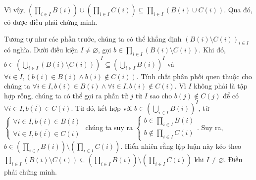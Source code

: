Vì vậy, $\left(\prod_{i \in I}B(i)\right) \cup \left(\prod_{i \in I}C(i)\right) \subseteq \prod_{i \in I}\left(B(i) \cup C(i)\right)$. Qua đó, có được điều phải chứng minh.

\stepSubexercise Tương tự như các phần trước, chúng ta có thể khẳng định $\left(B(i) \setminus C(i)\right)_{i \in I}$ có nghĩa. Dưới điều kiện $I \neq \varnothing$, gọi $b \in \prod_{i \in I}\left(B(i) \setminus C(i)\right)$. Khi đó, $b \in \left(\bigcup_{i \in I}(B(i) \setminus C(i))\right)^I \subseteq \left(\bigcup_{i \in I}B(i)\right)^I$ và $\forall i \in I, \left(b(i) \in B(i) \land b(i) \notin C(i)\right)$. Tính chất phân phối quen thuộc cho chúng ta $\forall i \in I, b(i) \in B(i) \land \forall i \in I, b(i) \notin C(i)$. Vì $I$ không phải là tập hợp rỗng, chúng ta có thể gọi ra phần tử $j$ từ $I$ sao cho $b(j) \notin C(j)$ để có $\overline{\forall i \in I, b(i) \in C(i)}$. Từ đó, kết hợp với $b \in \left(\bigcup_{i \in I}B(i)\right)^I$, từ $\begin{cases}
   \forall i \in I, b(i) \in B(i) \\
   \overline{\forall i \in I, b(i) \in C(i)}
\end{cases}$ chúng ta suy ra $\begin{cases}
   b \in \prod_{i \in I}B(i) \\
   b \notin \prod_{i \in I}C(i)
\end{cases}$. Suy ra, $b \in \left(\prod_{i \in I}B(i)\right) \setminus \left(\prod_{i \in I}C(i)\right)$. Hiển nhiên rằng lập luận này kéo theo $\prod_{i \in I}\left(B(i) \setminus C(i)\right) \subseteq \left(\prod_{i \in I}B(i)\right) \setminus \left(\prod_{i \in I}C(i)\right)$ khi $I \neq \varnothing$. Điều phải chứng minh.


